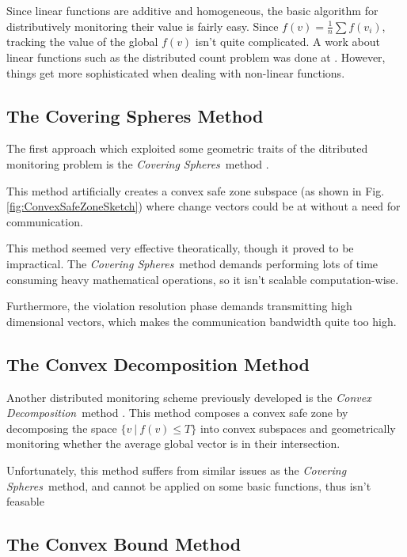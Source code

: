 \documentclass[11pt, conference]{article}
\newcommand{\coveringSpheres}{\textit{Covering Spheres}}
\newcommand{\convexDecomposition}{\textit{Convex Decomposition}}
\begin{document}
Since linear functions are additive and homogeneous, the basic algorithm for distributively monitoring their value is fairly easy. Since ${f(v) = \frac{1}{n}\sum f(v_i)}$, tracking the value of the global $f(v)$ isn't quite complicated. A work about linear functions such as the distributed count problem was done at \cite{keralapura2006communication}. However, things get more sophisticated when dealing with non-linear functions.

\subsection{The Covering Spheres Method}

The first approach which exploited some geometric traits of the ditributed monitoring problem is the \coveringSpheres \ method \cite{sharfman2007geometric}.

This method artificially creates a convex safe zone subspace (as shown in Fig. \ref{fig:ConvexSafeZoneSketch}) where change vectors could be at without a need for communication.

This method seemed very effective theoratically, though it proved to be impractical. The \coveringSpheres \ method demands performing lots of time consuming heavy mathematical operations, so it isn't scalable computation-wise.

Furthermore, the violation resolution phase demands transmitting high dimensional vectors, which makes the communication bandwidth quite too high.

\subsection{The Convex Decomposition Method}

Another distributed monitoring scheme previously developed is the \convexDecomposition \ method \cite{lazerson2015monitoring}. This method composes a convex safe zone by decomposing the space ${\{v \ | \ f(v) \leq T\}}$ into convex subspaces and geometrically monitoring whether the average global vector is in their intersection.

Unfortunately, this method suffers from similar issues as the \coveringSpheres \ method, and cannot be applied on some basic functions, thus isn't feasable \cite{lazerson2018lightweight}

\subsection{The Convex Bound Method}
\end{document}
